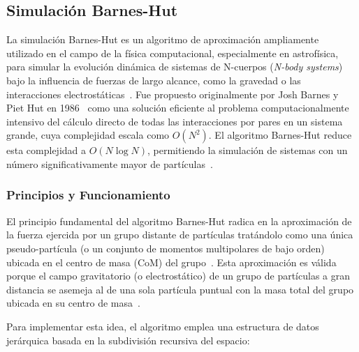 \subsection{Simulación Barnes-Hut}%
\label{sec:barnes_hut}

La simulación Barnes-Hut es un algoritmo de aproximación ampliamente utilizado en el campo de la física computacional, especialmente en astrofísica, para simular la evolución dinámica de sistemas de N-cuerpos (\textit{N-body systems}) bajo la influencia de fuerzas de largo alcance, como la gravedad o las interacciones electrostáticas~\cite{Barnes1986, dubinski1996}. Fue propuesto originalmente por Josh Barnes y Piet Hut en 1986~\cite{Barnes1986} como una solución eficiente al problema computacionalmente intensivo del cálculo directo de todas las interacciones por pares en un sistema grande, cuya complejidad escala como $O(N^2)$. El algoritmo Barnes-Hut reduce esta complejidad a $O(N \log N)$, permitiendo la simulación de sistemas con un número significativamente mayor de partículas~\cite{Barnes1986, salmon1991}.

\subsubsection{Principios y Funcionamiento}

El principio fundamental del algoritmo Barnes-Hut radica en la aproximación de la fuerza ejercida por un grupo distante de partículas tratándolo como una única pseudo-partícula (o un conjunto de momentos multipolares de bajo orden) ubicada en el centro de masa (CoM) del grupo~\cite{Barnes1986, barnes1990}. Esta aproximación es válida porque el campo gravitatorio (o electrostático) de un grupo de partículas a gran distancia se asemeja al de una sola partícula puntual con la masa total del grupo ubicada en su centro de masa~\cite{pfalzner1996}.

Para implementar esta idea, el algoritmo emplea una estructura de datos jerárquica basada en la subdivisión recursiva del espacio:

